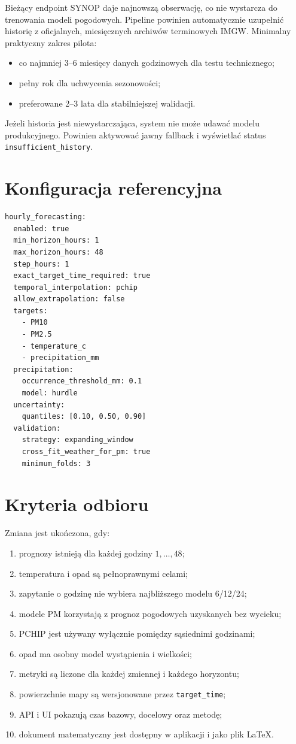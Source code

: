 \documentclass[11pt,a4paper,oneside]{article}
\begin{document}
Bieżący endpoint SYNOP daje najnowszą obserwację, co nie wystarcza do
trenowania modeli pogodowych. Pipeline powinien automatycznie uzupełnić
historię z oficjalnych, miesięcznych archiwów terminowych IMGW. Minimalny
praktyczny zakres pilota:
\begin{itemize}[nosep]
  \item co najmniej 3--6 miesięcy danych godzinowych dla testu technicznego;
  \item pełny rok dla uchwycenia sezonowości;
  \item preferowane 2--3 lata dla stabilniejszej walidacji.
\end{itemize}

Jeżeli historia jest niewystarczająca, system nie może udawać modelu
produkcyjnego. Powinien aktywować jawny fallback i wyświetlać status
\texttt{insufficient\_history}.

\section{Konfiguracja referencyjna}

\begin{lstlisting}[style=code]
hourly_forecasting:
  enabled: true
  min_horizon_hours: 1
  max_horizon_hours: 48
  step_hours: 1
  exact_target_time_required: true
  temporal_interpolation: pchip
  allow_extrapolation: false
  targets:
    - PM10
    - PM2.5
    - temperature_c
    - precipitation_mm
  precipitation:
    occurrence_threshold_mm: 0.1
    model: hurdle
  uncertainty:
    quantiles: [0.10, 0.50, 0.90]
  validation:
    strategy: expanding_window
    cross_fit_weather_for_pm: true
    minimum_folds: 3
\end{lstlisting}

\section{Kryteria odbioru}

Zmiana jest ukończona, gdy:
\begin{enumerate}
  \item prognozy istnieją dla każdej godziny $1,\ldots,48$;
  \item temperatura i opad są pełnoprawnymi celami;
  \item zapytanie o godzinę nie wybiera najbliższego modelu 6/12/24;
  \item modele PM korzystają z prognoz pogodowych uzyskanych bez wycieku;
  \item PCHIP jest używany wyłącznie pomiędzy sąsiednimi godzinami;
  \item opad ma osobny model wystąpienia i wielkości;
  \item metryki są liczone dla każdej zmiennej i każdego horyzontu;
  \item powierzchnie mapy są wersjonowane przez \texttt{target\_time};
  \item API i UI pokazują czas bazowy, docelowy oraz metodę;
  \item dokument matematyczny jest dostępny w aplikacji i jako plik \LaTeX.
\end{enumerate}
\end{document}
